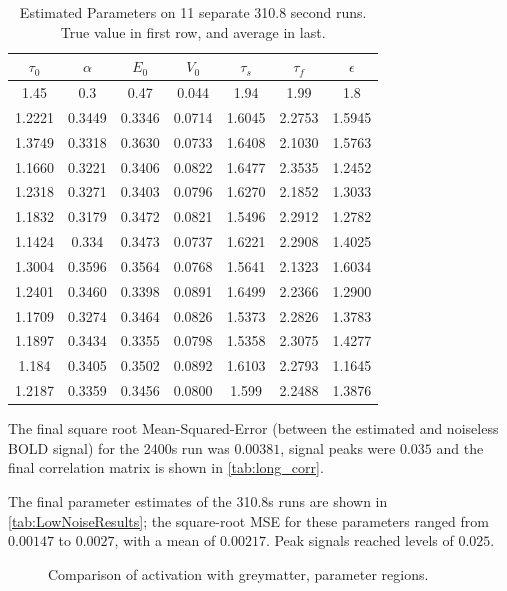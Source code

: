 \documentclass[journal]{./IEEEtran}
\begin{document}
\begin{table}[!t]
\renewcommand{\arraystretch}{1.3}
\centering
\begin{tabular}{|c | c | c | c | c | c | c | }
\hline
$\tau_0$ & $\alpha$ & $E_0$    & $V_0$    & $\tau_s$ & $\tau_f$ & $\epsilon$ \\
\hline
\rowcolor[gray]{.8}
1.45 & 0.3 & 0.47 & 0.044 & 1.94 & 1.99 & 1.8  \\
\hline
\hline
1.2221 & 0.3449 & 0.3346 & 0.0714 & 1.6045 & 2.2753 & 1.5945 \\
1.3749 & 0.3318 & 0.3630 & 0.0733 & 1.6408 & 2.1030 & 1.5763 \\
1.1660 & 0.3221 & 0.3406 & 0.0822 & 1.6477 & 2.3535 & 1.2452 \\
1.2318 & 0.3271 & 0.3403 & 0.0796 & 1.6270 & 2.1852 & 1.3033 \\
1.1832 & 0.3179 & 0.3472 & 0.0821 & 1.5496 & 2.2912 & 1.2782 \\
1.1424 & 0.334  & 0.3473 & 0.0737 & 1.6221 & 2.2908 & 1.4025 \\
1.3004 & 0.3596 & 0.3564 & 0.0768 & 1.5641 & 2.1323 & 1.6034 \\
1.2401 & 0.3460 & 0.3398 & 0.0891 & 1.6499 & 2.2366 & 1.2900 \\
1.1709 & 0.3274 & 0.3464 & 0.0826 & 1.5373 & 2.2826 & 1.3783 \\
1.1897 & 0.3434 & 0.3355 & 0.0798 & 1.5358 & 2.3075 & 1.4277 \\
1.184 &  0.3405 & 0.3502 & 0.0892 & 1.6103 & 2.2793 & 1.1645 \\
\hline
1.2187 & 0.3359 & 0.3456 & 0.0800 & 1.599 & 2.2488 & 1.3876 \\
\hline
\end{tabular}
\caption{Estimated Parameters on 11 separate 310.8 second runs. 
    True value in first row,
    and average in last.}
\label{tab:LowNoiseResults}
\end{table}

The final square root Mean-Squared-Error (between the estimated and 
noiseless BOLD signal) for the 2400s run was $0.00381$, signal
peaks were $0.035$
and the final correlation matrix is shown in \autoref{tab:long_corr}.

The final parameter estimates of the 310.8s runs are shown in
\autoref{tab:LowNoiseResults}; the square-root MSE for these
parameters ranged from $0.00147$ to $0.0027$, with a mean of 
$0.00217$. Peak signals reached levels of $0.025$.

\begin{figure}[!t]
\hfil
{}
\caption{Comparison of activation with greymatter, parameter regions.}
\label{fig:simslice_hm}
\end{figure}
\end{document}
